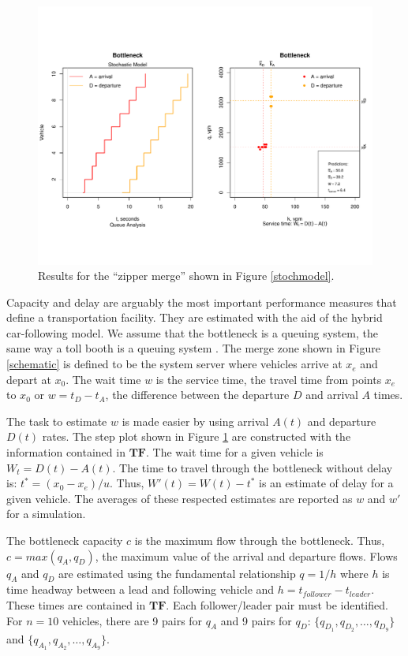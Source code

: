 \documentclass[Proceedings]{ascelike}
\begin{document}
\begin{figure}
\centering
\includegraphics[width = 7in]{Rplot05.pdf}
\caption{Results for the  ``zipper merge'' shown in Figure \ref{stochmodel}.}
\label{bbmodelAD}
\end{figure}

Capacity and delay are arguably the most important performance measures that define a transportation facility. They are estimated with the aid of the hybrid car-following model. We assume that the bottleneck is a queuing system, the same way a toll booth is a queuing system \cite{banks:1998}. The merge zone shown in Figure \ref{schematic} is defined to be the system server where vehicles arrive at $x_e$ and depart at $x_0$. The wait  time $w$ is the service time, the  travel time from points $x_e$ to $x_0$ or  $w = t_D - t_A$, the difference between the departure $D$ and arrival $A$ times. 

The task to estimate $w$  is made easier by using arrival  $A(t)$ and departure $D(t)$ rates.  The step plot shown in Figure \ref{bbmodelAD} are constructed with the information contained in $\mathbf{TF}$. The wait time for a given vehicle is $W_t = D(t) - A(t)$. The  time to travel through the bottleneck without delay is: $t^* = (x_0 - x_e)/u$.  Thus, $W'(t) = W(t) - t^*$ is an estimate of delay for a given vehicle. The averages of these respected estimates are reported as $w$ and $w'$ for a simulation.


The bottleneck capacity $c$ is the maximum flow through the bottleneck. Thus, $c = max(q_A,q_D)$, the maximum value of the arrival and departure flows.  Flows $q_A$ and  $q_D$ are estimated using the fundamental relationship $q = 1/h$ where $h$ is time headway between a lead and following vehicle and $h = t_{follower} - t_{leader}$. These times are contained in  $\mathbf{TF}$. Each follower/leader pair must be identified. For $n = 10$ vehicles, there are 9 pairs for $q_A$  and 9 pairs for $q_D$: $\{q_{D_1},q_{D_2},\ldots,q_{D_9}\}$ and $\{q_{A_1},q_{A_2},\ldots,q_{A_9}\}$.
\end{document}

